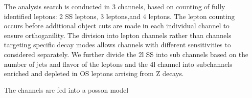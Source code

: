 The analysis search is conducted in 3 channels, based on counting of fully identified
leptons: 2 SS leptons, 3 leptons,and 4 leptons. The lepton counting occurs before additional object cuts are made in each individual 
channel to ensure orthoganility. The division into lepton channels rather than channels targeting specific decay modes
allows channels with different sensitivities to considered separately. We further divide the 2l SS into sub channels
based on the number of jets and flavor of the leptons and the 4l channel into subchannels enriched and depleted in OS leptons arrising from Z decays. 

The channels are fed into a posson model 



